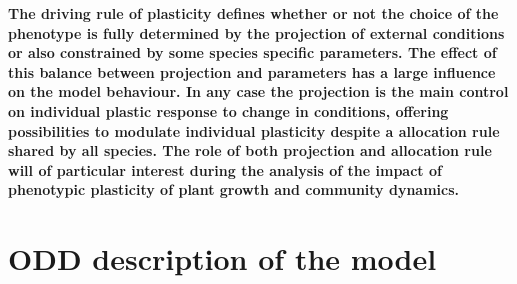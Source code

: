 \textbf{
The driving rule of plasticity defines whether or not the choice of the  phenotype is fully determined by the projection of external conditions or also constrained by some species specific parameters. The effect of this balance between projection and parameters has a large influence on the model behaviour. In any case the projection is the main control on individual plastic response to change in conditions, offering possibilities to modulate individual plasticity despite a allocation rule shared by all species. The role of both projection and allocation rule will of particular interest during the analysis of the impact of phenotypic plasticity of plant growth and community dynamics.}




\chapter{ODD description of the model \model}\label{chapter:model-description}





